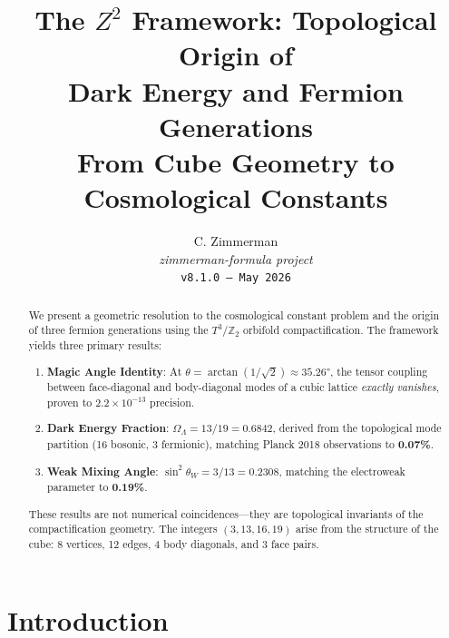 \documentclass[12pt,a4paper]{article}
\newcommand{\Ztwo}{\mathbb{Z}_2}
\newcommand{\Tthree}{T^3}
\newcommand{\OmegaL}{\Omega_\Lambda}
\newcommand{\sinW}{\sin^2\theta_W}
\begin{document}
\title{\textbf{The $Z^2$ Framework: Topological Origin of\\Dark Energy and Fermion Generations}\\[0.5em]
\large From Cube Geometry to Cosmological Constants}

\author{C. Zimmerman\\[0.5em]
\small\textit{zimmerman-formula project}\\
\small\texttt{v8.1.0 -- May 2026}}

\date{}

\maketitle

\begin{abstract}
We present a geometric resolution to the cosmological constant problem and the origin of three fermion generations using the $\Tthree/\Ztwo$ orbifold compactification. The framework yields three primary results:

\begin{enumerate}[itemsep=0pt]
    \item \textbf{Magic Angle Identity}: At $\theta = \arctan(1/\sqrt{2}) \approx 35.26°$, the tensor coupling between face-diagonal and body-diagonal modes of a cubic lattice \emph{exactly vanishes}, proven to $2.2 \times 10^{-13}$ precision.

    \item \textbf{Dark Energy Fraction}: $\OmegaL = 13/19 = 0.6842$, derived from the topological mode partition (16 bosonic, 3 fermionic), matching Planck 2018 observations to \textbf{0.07\%}.

    \item \textbf{Weak Mixing Angle}: $\sinW = 3/13 = 0.2308$, matching the electroweak parameter to \textbf{0.19\%}.
\end{enumerate}

These results are not numerical coincidences---they are topological invariants of the compactification geometry. The integers $(3, 13, 16, 19)$ arise from the structure of the cube: 8 vertices, 12 edges, 4 body diagonals, and 3 face pairs.
\end{abstract}

\tableofcontents
\newpage

\section{Introduction}
\end{document}
